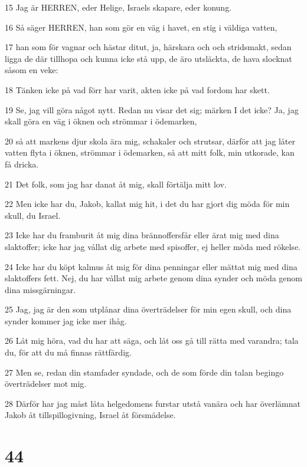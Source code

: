 \par 15 Jag är HERREN, eder Helige, Israels skapare, eder konung.
\par 16 Så säger HERREN, han som gör en väg i havet, en stig i väldiga vatten,
\par 17 han som för vagnar och hästar ditut, ja, härskara och och stridsmakt, sedan ligga de där tillhopa och kunna icke stå upp, de äro utsläckta, de hava slocknat såsom en veke:
\par 18 Tänken icke på vad förr har varit, akten icke på vad fordom har skett.
\par 19 Se, jag vill göra något nytt. Redan nu visar det sig; märken I det icke? Ja, jag skall göra en väg i öknen och strömmar i ödemarken,
\par 20 så att markens djur skola ära mig, schakaler och strutsar, därför att jag låter vatten flyta i öknen, strömmar i ödemarken, så att mitt folk, min utkorade, kan få dricka.
\par 21 Det folk, som jag har danat åt mig, skall förtälja mitt lov.
\par 22 Men icke har du, Jakob, kallat mig hit, i det du har gjort dig möda för min skull, du Israel.
\par 23 Icke har du framburit åt mig dina brännoffersfår eller ärat mig med dina slaktoffer; icke har jag vållat dig arbete med spisoffer, ej heller möda med rökelse.
\par 24 Icke har du köpt kalmus åt mig för dina penningar eller mättat mig med dina slaktoffers fett. Nej, du har vållat mig arbete genom dina synder och möda genom dina missgärningar.
\par 25 Jag, jag är den som utplånar dina överträdelser för min egen skull, och dina synder kommer jag icke mer ihåg.
\par 26 Låt mig höra, vad du har att säga, och låt oss gå till rätta med varandra; tala du, för att du må finnas rättfärdig.
\par 27 Men se, redan din stamfader syndade, och de som förde din talan begingo överträdelser mot mig.
\par 28 Därför har jag måst låta helgedomens furstar utstå vanära och har överlämnat Jakob åt tillspillogivning, Israel åt försmädelse.

\chapter{44}

